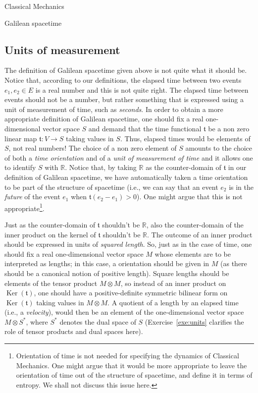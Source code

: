 \documentclass[oneside,a4paper,11pt]{amsbook}
\newcommand{\R}{\mathds R}
\DeclareMathOperator{\Ker}{Ker}
\theoremstyle{remark}\newtheorem{exercise}{Exercise}[chapter]
\theoremstyle{plain}\newtheorem{teo}{Theorem}[section]
\theoremstyle{plain}\newtheorem{lem}[teo]{Lemma}
\theoremstyle{plain}\newtheorem{prop}[teo]{Proposition}
\theoremstyle{plain}\newtheorem{cor}[teo]{Corollary}
\theoremstyle{definition}\newtheorem{defin}[teo]{Definition}
\theoremstyle{remark}\newtheorem{rem}[teo]{Remark}
\theoremstyle{definition}\newtheorem{notation}[teo]{Notation}
\theoremstyle{definition}\newtheorem{convention}[teo]{Convention}
\theoremstyle{definition}\newtheorem{example}[teo]{Example}
\numberwithin{section}{chapter}
\numberwithin{equation}{section}
\begin{document}
\begin{chapter}{Classical Mechanics}
\begin{section}{Galilean spacetime}
\subsection{Units of measurement}
The definition of Galilean spacetime given above is not quite what it should be.
Notice that, according to our definitions, the elapsed time between two events $e_1, e_2\in E$ is a real number and this is
not quite right. The elapsed time between events should not be a number, but rather something that is expressed
using a unit of measurement of time, such as {\em seconds}. In order to obtain a more appropriate definition of
Galilean spacetime, one should fix a real one-dimensional vector space $S$ and demand that the time functional $\mathfrak t$ be a non zero
linear map $\mathfrak t:V\to S$ taking values in $S$. Thus, elapsed times would be elements of $S$, not real numbers!
The choice of a non zero element of $S$ amounts to the choice of both a
{\em time orientation\/} and of a {\em unit of measurement of time\/} and it allows one to identify $S$ with $\R$.
Notice that, by taking $\R$
as the counter-domain of $\mathfrak t$ in our definition of Galilean spacetime, we have automatically taken a time orientation to
be part of the structure of spacetime (i.e., we can say that an event $e_2$ is in the {\em future\/} of the event $e_1$ when
$\mathfrak t(e_2-e_1)>0$). One might argue that this is not appropriate\footnote{%
Orientation of time is not needed for specifying the dynamics of Classical Mechanics. One might argue that it would
be more appropriate to leave the orientation of time out of the structure of spacetime, and define it in terms of entropy.
We shall not discuss this issue here.}.

Just as the counter-domain of $\mathfrak t$ shouldn't be $\R$, also the counter-domain of the inner product on the kernel of $\mathfrak t$
shouldn't be $\R$. The outcome of an inner product should be expressed in units of {\em squared length}. So, just as in the
case of time, one should fix a real one-dimensional vector space $M$ whose elements are to be interpreted as
lengths; in this case,
a orientation should be given in $M$ (as there should be a canonical notion of positive length). Square lengths should
be elements of the tensor product $M\otimes M$, so instead of an inner product on $\Ker(\mathfrak t)$,
one should have a positive-definite symmetric bilinear form on $\Ker(\mathfrak t)$ taking values in $M\otimes M$.
A quotient of a length by an elapsed time (i.e., a {\em velocity}), would then be an element
of the one-dimensional vector space $M\otimes S^*$, where $S^*$ denotes the dual space of $S$
(Exercise~\ref{exe:units} clarifies the role of tensor products and dual spaces here).


\end{section}
\end{chapter}
\end{document}

